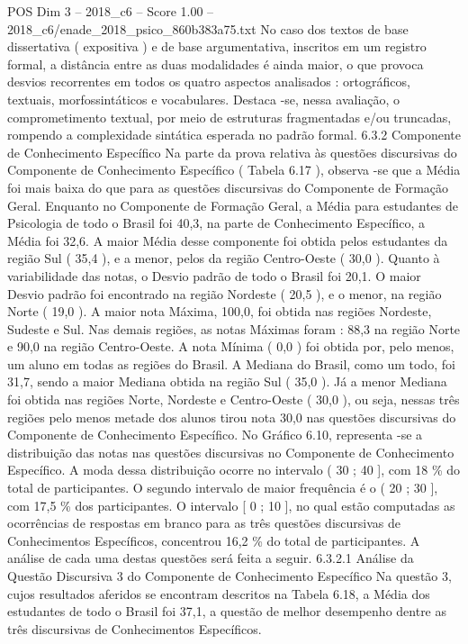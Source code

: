 \begin{textsample}{POS Dim 3 – 2018\_c6 – Score 1.00 – 2018\_c6/enade\_2018\_psico\_860b383a75.txt}
No caso dos textos de base dissertativa ( expositiva ) e de base argumentativa, inscritos em um registro formal, a distância entre as duas modalidades é ainda maior, o que provoca desvios recorrentes em todos os quatro aspectos analisados : ortográficos, textuais, morfossintáticos e vocabulares.
Destaca -se, nessa avaliação, o comprometimento textual, por meio de estruturas fragmentadas e/ou truncadas, rompendo a complexidade sintática esperada no padrão formal. 6.3.2 Componente de Conhecimento Específico Na parte da prova relativa às questões discursivas do Componente de Conhecimento Específico ( Tabela 6.17 ), observa -se que a Média foi mais baixa do que para as questões discursivas do Componente de Formação Geral.
Enquanto no Componente de Formação Geral, a Média para estudantes de Psicologia de todo o Brasil foi 40,3, na parte de Conhecimento Específico, a Média foi 32,6.
A maior Média desse componente foi obtida pelos estudantes da região Sul ( 35,4 ), e a menor, pelos da região Centro-Oeste ( 30,0 ).
Quanto à variabilidade das notas, o Desvio padrão de todo o Brasil foi 20,1.
O maior Desvio padrão foi encontrado na região Nordeste ( 20,5 ), e o menor, na região Norte ( 19,0 ).
A maior nota Máxima, 100,0, foi obtida nas regiões Nordeste, Sudeste e Sul.
Nas demais regiões, as notas Máximas foram : 88,3 na região Norte e 90,0 na região Centro-Oeste.
A nota Mínima ( 0,0 ) foi obtida por, pelo menos, um aluno em todas as regiões do Brasil.
A Mediana do Brasil, como um todo, foi 31,7, sendo a maior Mediana obtida na região Sul ( 35,0 ).
Já a menor Mediana foi obtida nas regiões Norte, Nordeste e Centro-Oeste ( 30,0 ), ou seja, nessas três regiões pelo menos metade dos alunos tirou nota 30,0 nas questões discursivas do Componente de Conhecimento Específico.
No Gráfico 6.10, representa -se a distribuição das notas nas questões discursivas no Componente de Conhecimento Específico.
A moda dessa distribuição ocorre no intervalo ( 30 ; 40 ], com 18 \% do total de participantes.
O segundo intervalo de maior frequência é o ( 20 ; 30 ], com 17,5 \% dos participantes.
O intervalo [ 0 ; 10 ], no qual estão computadas as ocorrências de respostas em branco para as três questões discursivas de Conhecimentos Específicos, concentrou 16,2 \% do total de participantes.
A análise de cada uma destas questões será feita a seguir. 6.3.2.1 Análise da Questão Discursiva 3 do Componente de Conhecimento Específico Na questão 3, cujos resultados aferidos se encontram descritos na Tabela 6.18, a Média dos estudantes de todo o Brasil foi 37,1, a questão de melhor desempenho dentre as três discursivas de Conhecimentos Específicos.

\end{textsample}
